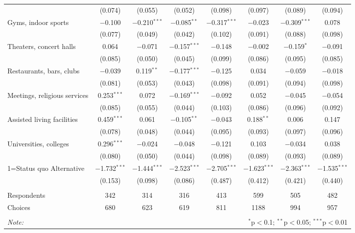 \begin{table}[!htbp]
\begin{tabular}{@{\extracolsep{5pt}}lccccccc}
  & (0.074) & (0.055) & (0.052) & (0.098) & (0.097) & (0.089) & (0.094) \\ 
  Gyms, indoor sports & $-$0.100 & $-$0.210$^{***}$ & $-$0.085$^{**}$ & $-$0.317$^{***}$ & $-$0.023 & $-$0.309$^{***}$ & 0.078 \\ 
  & (0.077) & (0.049) & (0.042) & (0.102) & (0.091) & (0.088) & (0.098) \\ 
  Theaters, concert halls & 0.064 & $-$0.071 & $-$0.157$^{***}$ & $-$0.148 & $-$0.002 & $-$0.159$^{*}$ & $-$0.091 \\ 
  & (0.085) & (0.050) & (0.045) & (0.099) & (0.086) & (0.095) & (0.085) \\ 
  Restaurants, bars, clubs & $-$0.039 & 0.119$^{**}$ & $-$0.177$^{***}$ & $-$0.125 & 0.034 & $-$0.059 & $-$0.018 \\ 
  & (0.081) & (0.053) & (0.043) & (0.098) & (0.091) & (0.094) & (0.098) \\ 
  Meetings, religious services & 0.253$^{***}$ & 0.072 & $-$0.169$^{***}$ & $-$0.092 & 0.052 & $-$0.045 & $-$0.054 \\ 
  & (0.085) & (0.055) & (0.044) & (0.103) & (0.086) & (0.096) & (0.092) \\ 
  Assisted living facilities & 0.459$^{***}$ & 0.061 & $-$0.105$^{**}$ & $-$0.043 & 0.188$^{**}$ & 0.006 & 0.147 \\ 
  & (0.078) & (0.048) & (0.044) & (0.095) & (0.093) & (0.097) & (0.096) \\ 
  Universities, colleges & 0.296$^{***}$ & $-$0.024 & $-$0.048 & $-$0.121 & 0.103 & $-$0.034 & 0.038 \\ 
  & (0.080) & (0.050) & (0.044) & (0.098) & (0.089) & (0.093) & (0.089) \\ 
  1=Status quo Alternative & $-$1.732$^{***}$ & $-$1.444$^{***}$ & $-$2.523$^{***}$ & $-$2.705$^{***}$ & $-$1.623$^{***}$ & $-$2.363$^{***}$ & $-$1.535$^{***}$ \\ 
  & (0.153) & (0.098) & (0.086) & (0.487) & (0.412) & (0.421) & (0.440) \\ 
 \hline \\[-1.8ex] 
Respondents & 342 & 314 & 316 & 413 & 599 & 505 & 482\\ 
 Choices & 680 & 623 & 619 & 811 & 1188 & 994 & 957\\ 
\hline 
\hline \\[-1.8ex] 
\textit{Note:}  & \multicolumn{7}{r}{$^{*}$p$<$0.1; $^{**}$p$<$0.05; $^{***}$p$<$0.01} \\ 
\end{tabular} 
\end{table} 
